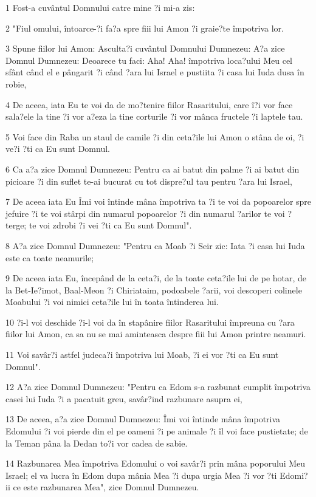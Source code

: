 \par 1 Fost-a cuvântul Domnului catre mine ?i mi-a zis:
\par 2 "Fiul omului, întoarce-?i fa?a spre fiii lui Amon ?i graie?te împotriva lor.
\par 3 Spune fiilor lui Amon: Asculta?i cuvântul Domnului Dumnezeu: A?a zice Domnul Dumnezeu: Deoarece tu faci: Aha! Aha! împotriva loca?ului Meu cel sfânt când el e pângarit ?i când ?ara lui Israel e pustiita ?i casa lui Iuda dusa în robie,
\par 4 De aceea, iata Eu te voi da de mo?tenire fiilor Rasaritului, care î?i vor face sala?ele la tine ?i vor a?eza la tine corturile ?i vor mânca fructele ?i laptele tau.
\par 5 Voi face din Raba un staul de camile ?i din ceta?ile lui Amon o stâna de oi, ?i ve?i ?ti ca Eu sunt Domnul.
\par 6 Ca a?a zice Domnul Dumnezeu: Pentru ca ai batut din palme ?i ai batut din picioare ?i din suflet te-ai bucurat cu tot dispre?ul tau pentru ?ara lui Israel,
\par 7 De aceea iata Eu Îmi voi întinde mâna împotriva ta ?i te voi da popoarelor spre jefuire ?i te voi stârpi din numarul popoarelor ?i din numarul ?arilor te voi ?terge; te voi zdrobi ?i vei ?ti ca Eu sunt Domnul".
\par 8 A?a zice Domnul Dumnezeu: "Pentru ca Moab ?i Seir zic: Iata ?i casa lui Iuda este ca toate neamurile;
\par 9 De aceea iata Eu, începând de la ceta?i, de la toate ceta?ile lui de pe hotar, de la Bet-Ie?imot, Baal-Meon ?i Chiriataim, podoabele ?arii, voi descoperi colinele Moabului ?i voi nimici ceta?ile lui în toata întinderea lui.
\par 10 ?i-l voi deschide ?i-l voi da în stapânire fiilor Rasaritului împreuna cu ?ara fiilor lui Amon, ca sa nu se mai aminteasca despre fiii lui Amon printre neamuri.
\par 11 Voi savâr?i astfel judeca?i împotriva lui Moab, ?i ei vor ?ti ca Eu sunt Domnul".
\par 12 A?a zice Domnul Dumnezeu: "Pentru ca Edom s-a razbunat cumplit împotriva casei lui Iuda ?i a pacatuit greu, savâr?ind razbunare asupra ei,
\par 13 De aceea, a?a zice Domnul Dumnezeu: Îmi voi întinde mâna împotriva Edomului ?i voi pierde din el pe oameni ?i pe animale ?i îl voi face pustietate; de la Teman pâna la Dedan to?i vor cadea de sabie.
\par 14 Razbunarea Mea împotriva Edomului o voi savâr?i prin mâna poporului Meu Israel; el va lucra în Edom dupa mânia Mea ?i dupa urgia Mea ?i vor ?ti Edomi?ii ce este razbunarea Mea", zice Domnul Dumnezeu.
